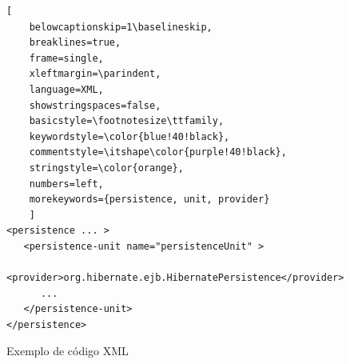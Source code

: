 \begin{figure}[!htb]
	\centering
	\caption{Exemplo de código XML}
	\label{fig:codigo_exemplo_xml}
	
	\begin{lstlisting}[
	belowcaptionskip=1\baselineskip,
	breaklines=true,
	frame=single,
	xleftmargin=\parindent,
	language=XML,
	showstringspaces=false,
	basicstyle=\footnotesize\ttfamily,
	keywordstyle=\color{blue!40!black},
	commentstyle=\itshape\color{purple!40!black},
	stringstyle=\color{orange},
	numbers=left,
	morekeywords={persistence, unit, provider}
	]
<persistence ... >
   <persistence-unit name="persistenceUnit" >
      <provider>org.hibernate.ejb.HibernatePersistence</provider>
      ...
   </persistence-unit>
</persistence>
	\end{lstlisting}
\end{figure}
